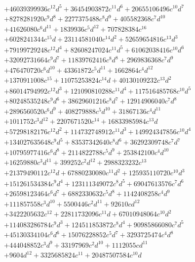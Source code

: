 {\begin{align*}
&+46039399936c^{12}d^{5}+36454903872c^{11}d^{6}+20655106496c^{10}d^{7}\\
&+8278281920c^{9}d^{8}+2277375488c^{8}d^{9}+405582368c^{7}d^{10}\\
&+41626080c^{6}d^{11}+1839936c^{5}d^{12}+707828384c^{16}\\
&+6028241344c^{15}d+23114581040c^{14}d^{2}+52659654816c^{13}d^{3}\\
&+79199729248c^{12}d^{4}+82608247024c^{11}d^{5}+61062038416c^{10}d^{6}\\
&+32092731664c^{9}d^{7}+11839762416c^{8}d^{8}+2969836368c^{7}d^{9}\\
&+476470720c^{6}d^{10}+43361872c^{5}d^{11}+1662864c^{4}d^{12}\\
&+1370911008c^{15}+11075253824c^{14}d+40130109232c^{13}d^{2}\\
&+86014794992c^{12}d^{3}+121090810288c^{11}d^{4}+117516485768c^{10}d^{5}\\
&+80248535248c^{9}d^{6}+38629601216c^{8}d^{7}+12914906040c^{7}d^{8}\\
&+2896560520c^{6}d^{9}+408279888c^{5}d^{10}+31867136c^{4}d^{11}\\
&+1011752c^{3}d^{12}+2207671520c^{14}+16833985984c^{13}d\\
&+57298182176c^{12}d^{2}+114732748912c^{11}d^{3}+149924347856c^{10}d^{4}\\
&+134027635648c^{9}d^{5}+83537342640c^{8}d^{6}+36292309748c^{7}d^{7}\\
&+10795977416c^{6}d^{8}+2114822788c^{5}d^{9}+253842100c^{4}d^{10}\\
&+16259880c^{3}d^{11}+399252c^{2}d^{12}+2988323232c^{13}\\
&+21379490112c^{12}d+67880230080c^{11}d^{2}+125935110720c^{10}d^{3}\\
&+151261534384c^{9}d^{4}+123111349072c^{8}d^{5}+69047613576c^{7}d^{6}\\
&+26598123464c^{6}d^{7}+6882330632c^{5}d^{8}+1142408258c^{4}d^{9}\\
&+111857558c^{3}d^{10}+5500446c^{2}d^{11}+92610cd^{12}\\
&+3422205632c^{12}+22811732096c^{11}d+67010948064c^{10}d^{2}\\
&+114083286784c^{9}d^{3}+124511853872c^{8}d^{4}+90985866080c^{7}d^{5}\\
&+45130334104c^{6}d^{6}+15076228852c^{5}d^{7}+3293725474c^{4}d^{8}\\
&+444048852c^{3}d^{9}+33197969c^{2}d^{10}+1112055cd^{11}\\
&+9604d^{12}+3325685824c^{11}+20487507584c^{10}d\\

\end{align*}}
